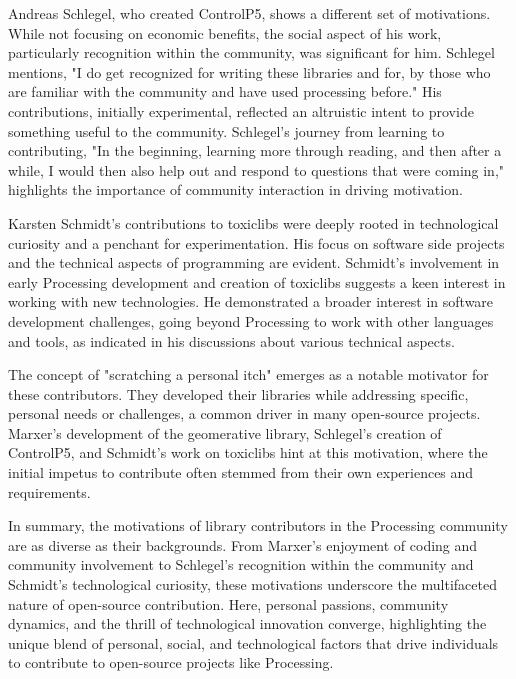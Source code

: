 Andreas Schlegel, who created ControlP5, shows a different set of motivations. While not focusing on economic benefits, the social aspect of his work, particularly recognition within the community, was significant for him. Schlegel mentions, "I do get recognized for writing these libraries and for, by those who are familiar with the community and have used processing before." His contributions, initially experimental, reflected an altruistic intent to provide something useful to the community. Schlegel's journey from learning to contributing, "In the beginning, learning more through reading, and then after a while, I would then also help out and respond to questions that were coming in," highlights the importance of community interaction in driving motivation.

Karsten Schmidt's contributions to toxiclibs were deeply rooted in technological curiosity and a penchant for experimentation. His focus on software side projects and the technical aspects of programming are evident. Schmidt's involvement in early Processing development and creation of toxiclibs suggests a keen interest in working with new technologies. He demonstrated a broader interest in software development challenges, going beyond Processing to work with other languages and tools, as indicated in his discussions about various technical aspects.

The concept of "scratching a personal itch" emerges as a notable motivator for these contributors. They developed their libraries while addressing specific, personal needs or challenges, a common driver in many open-source projects. Marxer's development of the geomerative library, Schlegel's creation of ControlP5, and Schmidt's work on toxiclibs hint at this motivation, where the initial impetus to contribute often stemmed from their own experiences and requirements.

In summary, the motivations of library contributors in the Processing community are as diverse as their backgrounds. From Marxer's enjoyment of coding and community involvement to Schlegel's recognition within the community and Schmidt's technological curiosity, these motivations underscore the multifaceted nature of open-source contribution. Here, personal passions, community dynamics, and the thrill of technological innovation converge, highlighting the unique blend of personal, social, and technological factors that drive individuals to contribute to open-source projects like Processing.

\changepapersize{305.3mm:210mm}


